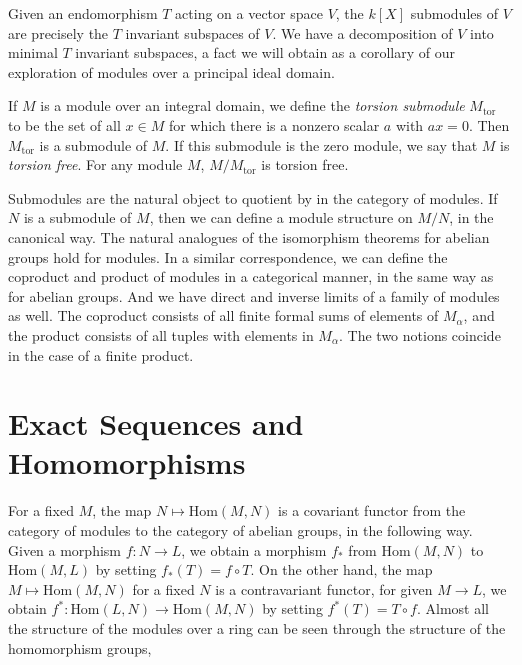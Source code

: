\begin{example}
    Given an endomorphism $T$ acting on a vector space $V$, the $k[X]$ submodules of $V$ are precisely the $T$ invariant subspaces of $V$. We have a decomposition of $V$ into minimal $T$ invariant subspaces, a fact we will obtain as a corollary of our exploration of modules over a principal ideal domain.
\end{example}

\begin{example}
    If $M$ is a module over an integral domain, we define the \emph{torsion submodule} $M_{\text{tor}}$ to be the set of all $x \in M$ for which there is a nonzero scalar $a$ with $ax = 0$. Then $M_{\text{tor}}$ is a submodule of $M$. If this submodule is the zero module, we say that $M$ is \emph{torsion free}. For any module $M$, $M/M_{\text{tor}}$ is torsion free.
\end{example}

Submodules are the natural object to quotient by in the category of modules. If $N$ is a submodule of $M$, then we can define a module structure on $M/N$, in the canonical way. The natural analogues of the isomorphism theorems for abelian groups hold for modules. In a similar correspondence, we can define the coproduct and product of modules in a categorical manner, in the same way as for abelian groups. And we have direct and inverse limits of a family of modules as well. The coproduct consists of all finite formal sums of elements of $M_\alpha$, and the product consists of all tuples with elements in $M_\alpha$. The two notions coincide in the case of a finite product.

\section{Exact Sequences and Homomorphisms}

For a fixed $M$, the map $N \mapsto \text{Hom}(M,N)$ is a covariant functor from the category of modules to the category of abelian groups, in the following way. Given a morphism $f: N \to L$, we obtain a morphism $f_*$ from $\text{Hom}(M,N)$ to $\text{Hom}(M,L)$ by setting $f_*(T) = f \circ T$. On the other hand, the map $M \mapsto \text{Hom}(M,N)$ for a fixed $N$ is a contravariant functor, for given $M \to L$, we obtain $f^*: \text{Hom}(L,N) \to \text{Hom}(M,N)$ by setting $f^*(T) = T \circ f$. Almost all the structure of the modules over a ring can be seen through the structure of the homomorphism groups, 

